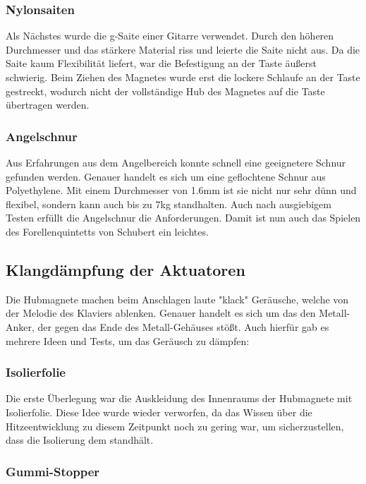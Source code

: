 \subsubsection{Nylonsaiten}

Als Nächstes wurde die g-Saite einer Gitarre verwendet.
Durch den höheren Durchmesser und das stärkere Material riss und leierte die Saite nicht aus.
Da die Saite kaum Flexibilität liefert, war die Befestigung an der Taste äußerst schwierig.
Beim Ziehen des Magnetes wurde erst die lockere Schlaufe an der Taste gestreckt, wodurch nicht der vollständige Hub des Magnetes auf die Taste übertragen werden.

\subsubsection{Angelschnur}

Aus Erfahrungen aus dem Angelbereich konnte schnell eine geeignetere Schnur gefunden werden.
Genauer handelt es sich um eine geflochtene Schnur aus Polyethylene.
Mit einem Durchmesser von 1.6mm ist sie nicht nur sehr dünn und flexibel, sondern kann auch bis zu 7kg standhalten.
Auch nach ausgiebigem Testen erfüllt die Angelschnur die Anforderungen.
Damit ist nun auch das Spielen des Forellenquintetts von Schubert ein leichtes.

\subsection{Klangdämpfung der Aktuatoren}
Die Hubmagnete machen beim Anschlagen laute "klack" Geräusche, welche von der Melodie des Klaviers ablenken.
Genauer handelt es sich um das den Metall-Anker, der gegen das Ende des Metall-Gehäuses stößt.
Auch hierfür gab es mehrere Ideen und Tests, um das Geräusch zu dämpfen:

\subsubsection{Isolierfolie}

Die erste Überlegung war die Auskleidung des Innenraums der Hubmagnete mit Isolierfolie.
Diese Idee wurde wieder verworfen, da das Wissen über die Hitzeentwicklung zu diesem Zeitpunkt noch zu gering war, um sicherzustellen, dass die Isolierung dem standhält.

\subsubsection{Gummi-Stopper}

